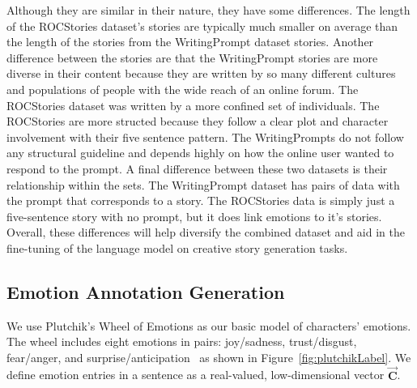 \documentclass[letterpaper]{article}
\begin{document}
Although they are similar in their nature, they have some differences. The length of the ROCStories dataset's stories are typically much smaller on average than the length of the stories from the WritingPrompt dataset stories. Another difference between the stories are that the WritingPrompt stories are more diverse in their content because they are written by so many different cultures and populations of people with the wide reach of an online forum. The ROCStories dataset was written by a more confined set of individuals. The ROCStories are more structed because they follow a clear plot and character involvement with their five sentence pattern. The WritingPrompts do not follow any structural guideline and depends highly on how the online user wanted to respond to the prompt. A final difference between these two datasets is their relationship within the sets. The WritingPrompt dataset has pairs of data with the prompt that corresponds to a story. The ROCStories data is simply just a five-sentence story with no prompt, but it does link emotions to it's stories. Overall, these differences will help diversify the combined dataset and aid in the fine-tuning of the language model on creative story generation tasks. 

\subsection{Emotion Annotation Generation}
We use Plutchik's Wheel of Emotions as our basic model of characters' emotions. The wheel includes eight emotions in pairs: joy/sadness, trust/disgust, fear/anger, and surprise/anticipation~\cite{plutchik1980general} as shown in Figure~\ref{fig:plutchikLabel}. We define emotion entries in a sentence as a real-valued, low-dimensional vector $\vec{\mathbf{C}}$.
\end{document}
